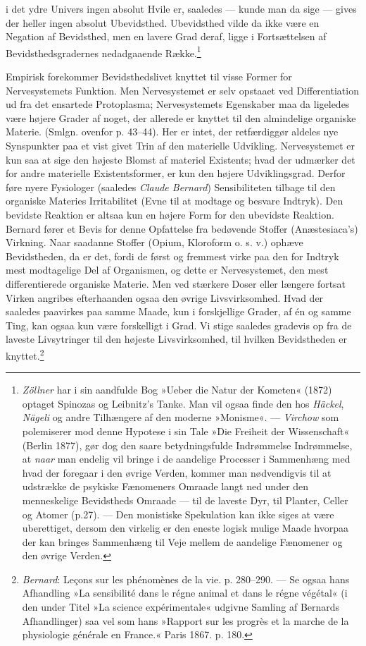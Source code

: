 \documentclass[12pt,a4paper,openany]{book}
\newcommand{\opage}[1]{\marginnote{\footnotesize\textit{[#1]}}}
\begin{document}
i det ydre Univers ingen absolut Hvile er, saaledes --- kunde man da
sige --- gives der heller ingen absolut Ubevidsthed. Ubevidsthed vilde
da ikke være en Negation af Bevidsthed, men en lavere Grad deraf, ligge
i Fortsættelsen af Bevidsthedsgradernes nedadgaaende
Række.\footnote[2]{\emph{Zöllner} har i sin aandfulde Bog »Ueber die
Natur der Kometen« (1872) optaget Spinozas og Leibnitz’s Tanke. Man vil
ogsaa finde den hos \emph{Häckel}, \emph{Nägeli} og andre Tilhængere af
den moderne »Monisme«. --- \emph{Virchow} som polemiserer mod denne
Hypotese i sin Tale »Die Freiheit der Wissenschaft« (Berlin 1877), gør
dog den saare betydningsfulde Indrømmelse Indrømmelse, at \emph{naar}
man endelig vil bringe i de aandelige Processer i Sammenhæng med hvad
der foregaar i den øvrige Verden, kommer man nødvendigvis til at
udstrække de psykiske Fænomeners Omraade langt ned under den
menneskelige Bevidstheds Omraade --- til de laveste Dyr, til Planter,
Celler og Atomer (p.27). --- Den monistiske Spekulation kan ikke siges
at være uberettiget, dersom den virkelig er den eneste logisk mulige
Maade hvorpaa der kan bringes Sammenhæng til Veje mellem de aandelige
Fænomener og den øvrige Verden.}

Empirisk forekommer Bevidsthedslivet knyttet til visse Former for
Nervesystemets Funktion. Men Nervesystemet er selv opstaaet ved
Differentiation ud fra det ensartede Protoplasma; Nervesystemets
Egenskaber maa da ligeledes være højere Grader af noget, der allerede er
knyttet til den almindelige organiske Materie. (Smlgn. ovenfor p.
43--44).
\opage{98}Her er intet, der retfærdiggør aldeles nye Synspunkter paa et
vist givet Trin af den materielle Udvikling. Nervesystemet er kun saa at
sige den højeste Blomst af materiel Existents; hvad der udmærker det for
andre materielle Existentsformer, er kun den højere Udviklingsgrad.
Derfor føre nyere Fysiologer (saaledes \emph{Claude Bernard})
Sensibiliteten tilbage til den organiske Materies Irritabilitet (Evne
til at modtage og besvare Indtryk). Den bevidste Reaktion er altsaa kun
en højere Form for den ubevidste Reaktion. Bernard fører et Bevis for
denne Opfattelse fra bedøvende Stoffer (Anæstesiaca’s) Virkning. Naar
saadanne Stoffer (Opium, Kloroform o. s. v.) ophæve Bevidstheden, da er
det, fordi de først og fremmest virke paa den for Indtryk mest
modtagelige Del af Organismen, og dette er Nervesystemet, den mest
differentierede organiske Materie. Men ved stærkere Doser eller længere
fortsat Virken angribes efterhaanden ogsaa den øvrige Livsvirksomhed.
Hvad der saaledes paavirkes paa samme Maade, kun i forskjellige Grader,
af én og samme Ting, kan ogsaa kun være forskelligt i Grad. Vi stige
saaledes gradevis op fra de laveste Livsytringer til den højeste
Livsvirksomhed, til hvilken Bevidstheden er
knyttet.\footnote[1]{\emph{Bernard}: Leçons sur les phénomènes de la
vie. p. 280--290. --- Se ogsaa hans Afhandling »La sensibilité dans le
régne animal et dans le régne végétal« (i den under Titel »La science
expérimentale« udgivne Samling af Bernards Afhandlinger) saa vel som
hans »Rapport sur les progrès et la marche de la physiologie générale en
France.« Paris 1867. p. 180.}
\end{document}
